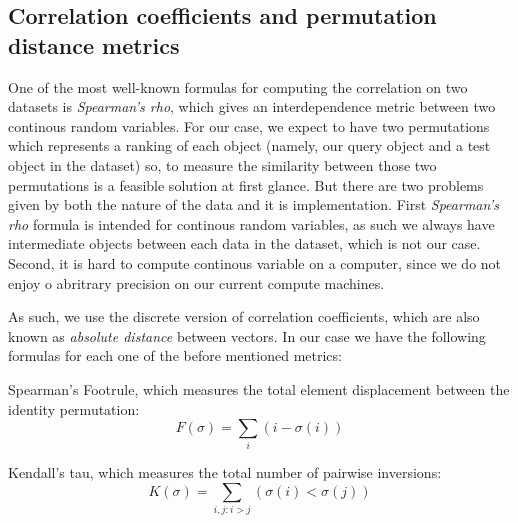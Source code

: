 \subsection{Correlation coefficients and permutation distance metrics}
One of the most well-known formulas for computing the correlation on two datasets is \emph{Spearman's rho}, which gives an interdependence metric
between two continous random variables. For our case, we expect to have two permutations which represents a ranking of each object (namely, our
query object and a test object in the dataset) so, to measure the similarity between those two permutations is a feasible solution at first glance. 
But there are two problems given by both the nature of the data and it is implementation. First \emph{Spearman's rho} formula is intended for continous
random variables, as such we always have intermediate objects between each data in the dataset, which is not our case. Second, it is hard to compute
continous variable on a computer, since we do not enjoy o abritrary precision on our current compute machines.

As such, we use the discrete version of correlation coefficients, which are also known as \emph{absolute distance} between vectors. In our case
we have the following formulas for each one of the before mentioned metrics:

Spearman's Footrule, which measures the total element displacement between the identity permutation:
$$ F(\sigma) = \sum_{i} (i-\sigma(i))$$

Kendall's tau, which measures the total number of pairwise inversions:
$$ K(\sigma) = \sum_{i,j : i>j} (\sigma(i)<\sigma(j))$$




